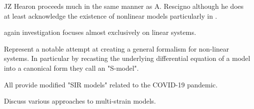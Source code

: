 \cite{hearon1963theorems, hearon1972path, hearon1972residence, hearon1979monotonicity, hearon1981residence} JZ Hearon proceeds much in the same manner as A. Rescigno although he does at least acknowledge the existence of nonlinear models particularly in \cite{hearon1963theorems}.

\cite{berman1956invariants, berman1963formulation, berman1963postulate} again investigation focuses almost exclusively on linear systems.

\cite{savageau1988introduction, voit1988recasting, voit1990s} Represent a notable attempt at creating a general formalism for non-linear systems. In particular by recasting the underlying differential equation of a model into a canonical form they call an "S-model".


\cite{friston2020dynamic, fields2021age, chang2022stochastic, lavielle2020extension} All provide modified "SIR models" related to the COVID-19 pandemic.

\cite{kryazhimskiy2007state, gog2002dynamics} Discuss various approaches to multi-strain models.




